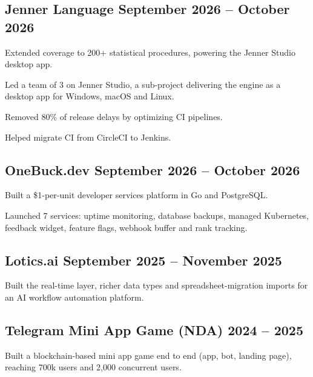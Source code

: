 \subsection{{Jenner Language \hfill September 2026 -- October 2026}}
\begin{zitemize}
\item Extended coverage to 200+ statistical procedures, powering the Jenner Studio desktop app.
\item Led a team of 3 on Jenner Studio, a sub-project delivering the engine as a desktop app for Windows, macOS and Linux.
\item Removed 80\% of release delays by optimizing CI pipelines.
\item Helped migrate CI from CircleCI to Jenkins.
\end{zitemize}

\subsection{{OneBuck.dev \hfill September 2026 -- October 2026}}
\begin{zitemize}
\item Built a \$1-per-unit developer services platform in Go and PostgreSQL.
\item Launched 7 services: uptime monitoring, database backups, managed Kubernetes, feedback widget, feature flags, webhook buffer and rank tracking.
\end{zitemize}

\subsection{{Lotics.ai \hfill September 2025 -- November 2025}}
\begin{zitemize}
\item Built the real-time layer, richer data types and spreadsheet-migration imports for an AI workflow automation platform.
\end{zitemize}

\subsection{{Telegram Mini App Game (NDA) \hfill 2024 -- 2025}}
\begin{zitemize}
\item Built a blockchain-based mini app game end to end (app, bot, landing page), reaching 700k users and 2,000 concurrent users.
\end{zitemize}

